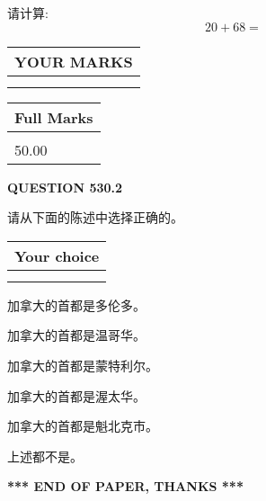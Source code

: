 \documentclass{ctexart}
\begin{document}
  
 
请计算:
\begin{equation}
20 +  %
68 = \nonumber
\end{equation}
 

 

 
  
\vspace{0.2in}
  
\noindent\begin{tabular}{|l|}
\hline
 YOUR MARKS  \\
\hline
 \\ 
 \\ 
\hline
\end{tabular}
\hspace{0.05in} \begin{tabular}{|l|}
\hline
 Full Marks  \\
\hline
 \\ 
50.00 \\
\hline
\end{tabular}
{\textbf{\Large{QUESTION
530.2 
}}}
  
  
请从下面的陈述中选择正确的。
  
  
\noindent\hspace{3.0in} \begin{tabular}{|l|}
\hline
Your choice \\
\hline
 \\ 
 \\ 
\hline
\end{tabular}
  
  
 
 
加拿大的首都是多伦多。
 
 
加拿大的首都是温哥华。
 
 
加拿大的首都是蒙特利尔。
 
 
加拿大的首都是渥太华。
 
 
加拿大的首都是魁北克市。
 
 
 上述都不是。
 
 
   
   
 \vspace{0.2in}
 
   
   
   
   
\vspace{1.0in} 
{\textbf{\large{ *** END OF PAPER, THANKS *** }}} 
   
\end{document}
